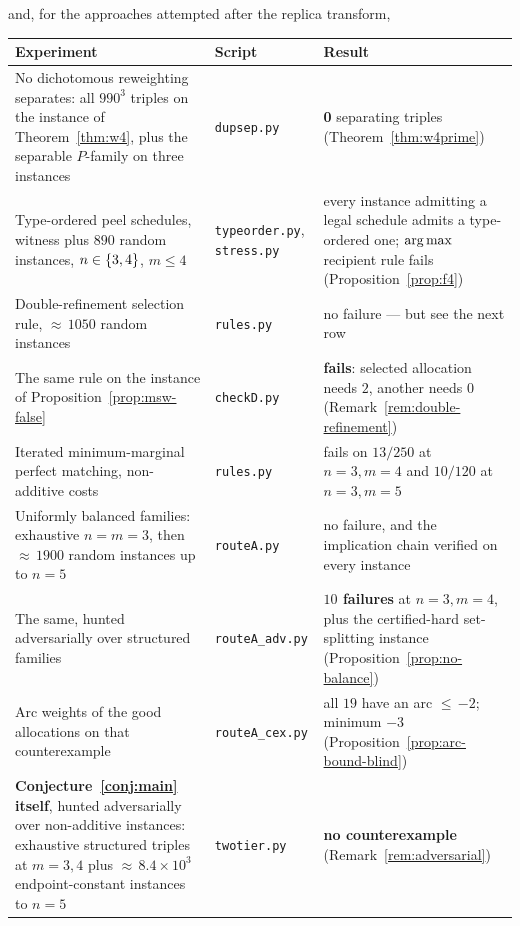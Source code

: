 \noindent
and, for the approaches attempted after the replica transform,

\begin{center}
\begin{tabular}{@{}p{}p{}p{}@{}}
\toprule
Experiment & Script & Result \\
\midrule
No dichotomous reweighting separates: all $990^3$ triples on the instance of
Theorem~\ref{thm:w4}, plus the separable $P$-family on three instances
  & \texttt{dupsep.py} & \textbf{0} separating triples
    (Theorem~\ref{thm:w4prime}) \\
Type-ordered peel schedules, witness plus $890$ random instances,
$n \in \left\{3,4\right\}$, $m \le 4$
  & \texttt{typeorder.py}, \texttt{stress.py} & every instance admitting a legal
    schedule admits a type-ordered one; $\operatorname*{arg\,max}$ recipient rule fails
    (Proposition~\ref{prop:f4}) \\
Double-refinement selection rule, ${\approx}\,1050$ random instances
  & \texttt{rules.py} & no failure --- but see the next row \\
The same rule on the instance of Proposition~\ref{prop:msw-false}
  & \texttt{checkD.py} & \textbf{fails}: selected allocation needs $2$, another
    needs $0$ (Remark~\ref{rem:double-refinement}) \\
Iterated minimum-marginal perfect matching, non-additive costs
  & \texttt{rules.py} & fails on $13/250$ at $n=3,m=4$ and $10/120$ at
    $n=3,m=5$ \\
\midrule
Uniformly balanced families: exhaustive $n=m=3$, then ${\approx}\,1900$ random
instances up to $n=5$
  & \texttt{routeA.py} & no failure, and the implication chain verified on every
    instance \\
The same, hunted adversarially over structured families
  & \texttt{routeA\_adv.py} & \textbf{$10$ failures} at $n=3,m=4$, plus the
    certified-hard set-splitting instance
    (Proposition~\ref{prop:no-balance}) \\
Arc weights of the good allocations on that counterexample
  & \texttt{routeA\_cex.py} & all $19$ have an arc ${\le}\,{-2}$; minimum $-3$
    (Proposition~\ref{prop:arc-bound-blind}) \\
\midrule
\textbf{Conjecture~\ref{conj:main} itself}, hunted adversarially over
non-additive instances: exhaustive structured triples at $m = 3,4$ plus
${\approx}\,8.4 \times 10^{3}$ endpoint-constant instances to $n=5$
  & \texttt{twotier.py} & \textbf{no counterexample}
    (Remark~\ref{rem:adversarial}) \\

\end{tabular}
\end{center}
